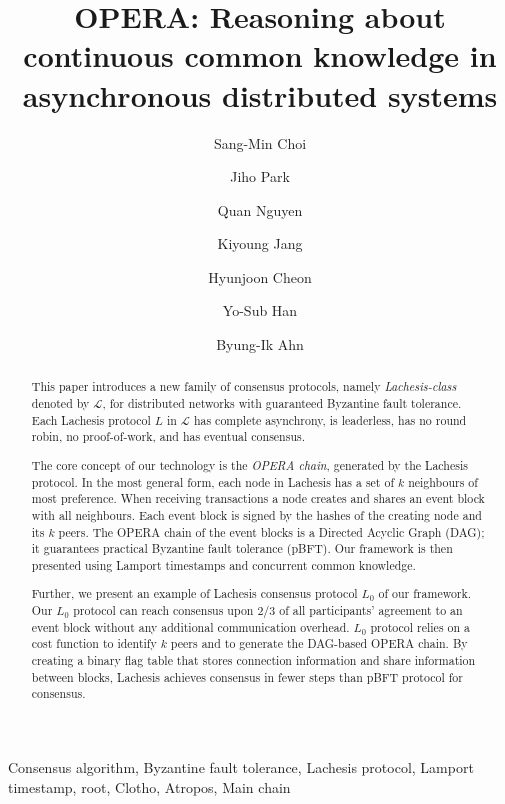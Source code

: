 \documentclass[preprint,12pt]{elsarticle}
\begin{document}
\begin{frontmatter}

\title{OPERA: Reasoning about continuous common knowledge in asynchronous distributed systems}

\author[add1]{Sang-Min Choi}
\author[add1]{Jiho Park}
\author[add1]{Quan Nguyen}
\author[add2]{Kiyoung Jang}
\author[add2]{Hyunjoon Cheon}
\author[add2]{Yo-Sub Han}
\author[add1]{Byung-Ik Ahn}

\address[add1]{FANTOM Lab, FANTOM Foundation}
\address[add2]{Department of Computer Science, Yonsei University}

\begin{abstract}
This paper introduces a new family of consensus protocols, namely \emph{Lachesis-class} denoted by $\mathcal{L}$, for distributed networks with guaranteed Byzantine fault tolerance. Each Lachesis protocol $L$ in $\mathcal{L}$ has complete asynchrony, is leaderless, has no round robin, no proof-of-work, and has eventual consensus.

The core concept of our technology is the \emph{OPERA chain}, generated by the Lachesis protocol. In the most general form, each node in Lachesis has a set of $k$ neighbours of most preference. When receiving transactions a node creates and shares an event block with all neighbours. Each event block is signed by the hashes of the creating node and its $k$ peers. The OPERA chain of the event blocks is a Directed Acyclic Graph (DAG); it guarantees practical Byzantine fault tolerance (pBFT). Our framework is then presented using Lamport timestamps and concurrent common knowledge.

Further, we present an example of Lachesis consensus protocol $L_0$ of our framework. Our $L_0$ protocol can reach consensus upon 2/3 of all participants' agreement to an event block without any additional communication overhead. $L_0$ protocol relies on a cost function to identify $k$ peers and to generate the DAG-based OPERA chain. By creating a binary flag table that stores connection information and share information between blocks, Lachesis achieves consensus in fewer steps than pBFT protocol for consensus.
\end{abstract}

\begin{keyword}
Consensus algorithm, Byzantine fault tolerance, Lachesis protocol, Lamport timestamp, root, Clotho, Atropos, Main chain

\end{keyword}

\end{frontmatter}
\newpage
    \tableofcontents 
\newpage
\end{document}
